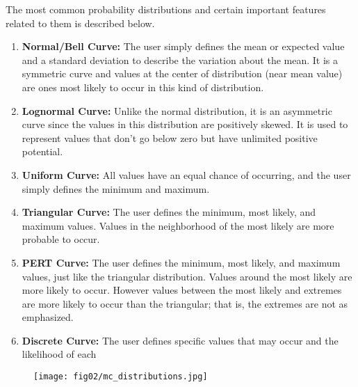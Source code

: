 The most common probability distributions and certain important features related to them is described below.
\begin{enumerate}
	\item \textbf{Normal/Bell Curve:} The user simply defines the mean or expected value and a standard deviation to describe the variation about the mean. It is a symmetric curve and values at the center of distribution (near mean value) are ones most likely to occur in this kind of distribution. 
	
	\item \textbf{Lognormal Curve:} Unlike the normal distribution, it is an asymmetric curve since the values in this distribution are positively skewed. It is used to represent values that don't go below zero but have unlimited positive potential.
		
	\item \textbf{Uniform Curve:} All values have an equal chance of occurring, and the user simply defines the minimum and maximum. 
		
	\item \textbf{Triangular Curve:} The user defines the minimum, most likely, and maximum values. Values in the neighborhood of the most likely are more probable to occur. 
	
	\item \textbf{PERT Curve:}	The user defines the minimum, most likely, and maximum values, just like the triangular distribution. Values around the most likely are more likely to occur. However values between the most likely and extremes are more likely to occur than the triangular; that is, the extremes are not as emphasized. 
	
		\item \textbf{Discrete Curve:} The user defines specific values that may occur and the likelihood of each
\end{enumerate}

\begin{figure}
	\centering
	\texttt{[image: fig02/mc\_distributions.jpg]}
\end{figure}


